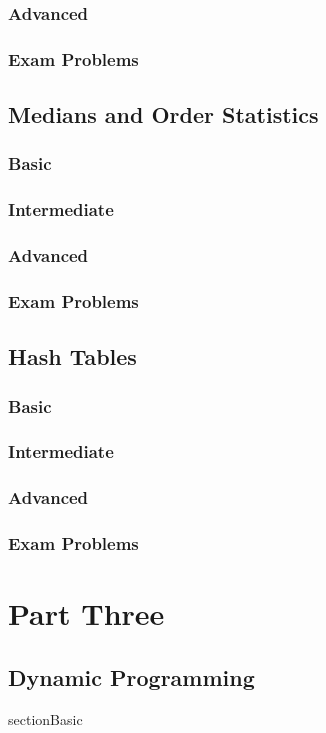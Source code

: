 \documentclass[11pt,fleqn]{book}
\begin{document}
\section{Advanced}
\section{Exam Problems}
\chapter{Medians and Order Statistics}
\section{Basic}
\section{Intermediate}
\section{Advanced}
\section{Exam Problems}
\chapter{Hash Tables}
\section{Basic}
\section{Intermediate}
\section{Advanced}
\section{Exam Problems}

\part{Part Three}
\chapter{Dynamic Programming}
section{Basic}
\end{document}
